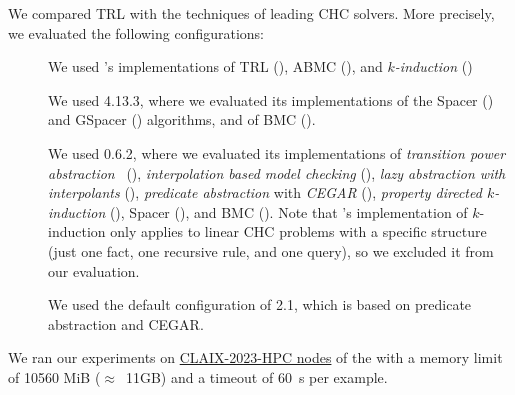 We compared TRL with the techniques of leading CHC solvers.
%
More precisely, we evaluated the following configurations:
\begin{description}
  \item[] We used 's implementations of TRL (), ABMC \cite{abmc}
    (), and \emph{$k$-induction} \cite{kind} ()
  \item[ \cite{z3}] We used  4.13.3, where we evaluated its implementations of the Spacer \cite{spacer} () and GSpacer \cite{gspacer} () algorithms, and of BMC ().
  \item[ \cite{golem}] We used  0.6.2, where we evaluated its implementations of \emph{transition power abstraction}~\cite{tpa-multiloop} (), \emph{interpolation based model checking} \cite{imc} (), \emph{lazy abstraction with interpolants} \cite{lawi} (), \emph{predicate abstraction} \cite{predicate_abstraction} with \emph{CEGAR} \cite{cegar} (), \emph{property directed $k$-induction} \cite{pdkind} (), Spacer (), and BMC ().
        Note that 's implementation of $k$-induction only applies to linear CHC problems with a specific structure (just one fact, one recursive rule, and one query), so we excluded it from our evaluation.
  \item[ \cite{eldarica}] We used the default configuration of  2.1, which is based on predicate abstraction and CEGAR.
\end{description}
%
We ran our experiments on \href{https://help.itc.rwth-aachen.de/service/rhr4fjjutttf/article/fbd107191cf14c4b8307f44f545cf68a/}{CLAIX-2023-HPC nodes} of the  with a memory limit of 10560 MiB ($\approx$~11GB) and a timeout of 60~s per example.

